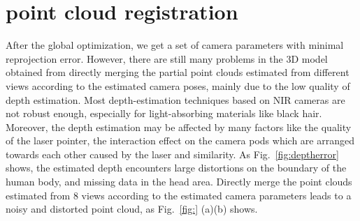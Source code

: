 
\section{point cloud registration}
\label{sec:registration}


After the global optimization, we get a set of camera parameters with minimal reprojection error.
However, there are still many problems in the 3D model obtained from directly merging the partial point clouds estimated from different views according to the estimated camera poses, mainly due to the low quality of depth estimation.
%
Most depth-estimation techniques based on NIR cameras are not robust enough, especially for light-absorbing materials like black hair.
Moreover, the depth estimation may be affected by many factors like the quality of the laser pointer, the interaction effect on the camera pods which are arranged towards each other caused by the laser and similarity.
As Fig.~\ref{fig:deptherror} shows, the estimated depth encounters large distortions on the boundary of the human body, and missing data in the head area.
Directly merge the point clouds estimated from 8 views according to the estimated camera parameters leads to a noisy and distorted point cloud, as Fig.~\ref{fig:} (a)(b) shows.

